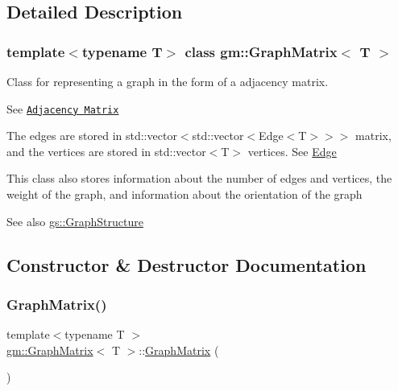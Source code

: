 \subsection{Detailed Description}
\subsubsection*{template$<$typename T$>$\newline
class gm\+::\+Graph\+Matrix$<$ T $>$}

Class for representing a graph in the form of a adjacency matrix. 

See \href{https://en.wikipedia.org/wiki/Adjacency_matrix}{\tt Adjacency Matrix}

The edges are stored in \textquotesingle{}std\+::vector$<$std\+::vector$<$Edge$<$\+T$>$$>$$>$ matrix\textquotesingle{}, and the vertices are stored in \textquotesingle{}std\+::vector$<$\+T$>$ vertices\textquotesingle{}. See \mbox{\hyperlink{structgm_1_1_edge}{Edge}}

This class also stores information about the number of edges and vertices, the weight of the graph, and information about the orientation of the graph

\begin{DoxySeeAlso}{See also}
\mbox{\hyperlink{classgs_1_1_graph_structure}{gs\+::\+Graph\+Structure}} 
\end{DoxySeeAlso}


\subsection{Constructor \& Destructor Documentation}
\mbox{\label{classgm_1_1_graph_matrix_a8f4f156e67d7425f1cc5784384a83757}} 
\subsubsection{\texorpdfstring{Graph\+Matrix()}{GraphMatrix()}\hspace{0.1cm}{\footnotesize\ttfamily [1/3]}}
{\footnotesize\ttfamily template$<$typename T $>$ \\
\mbox{\hyperlink{classgm_1_1_graph_matrix}{gm\+::\+Graph\+Matrix}}$<$ T $>$\+::\mbox{\hyperlink{classgm_1_1_graph_matrix}{Graph\+Matrix}} (\begin{DoxyParamCaption}{ }\end{DoxyParamCaption})}



